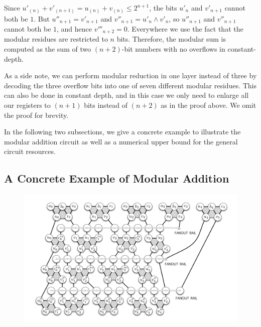 Since $u'_{(n)} + v'_{(n+1)} =
u_{(n)} + v_{(n)} \le 2^{n+1}$, the bits $u'_n$ and $v'_{n+1}$ cannot both be $1$.
But $u''_{n+1} = v'_{n+1}$ and $v''_{n+1} = u'_n\land v'_n$, so $u''_{n+1}$ and
$v''_{n+1}$ cannot both be $1$, and hence $v'''_{n+2} = 0$.
Everywhere
we use the fact that the modular residues are restricted to $n$ bits.
Therefore, the modular sum is computed as the sum of two $(n+2)$-bit numbers
with no overflows in constant-depth.
\square\,

As a side note, we can perform modular reduction in one layer instead of
three by decoding the three overflow bits into one of seven different
modular residues. This can also be done in constant depth, and in this case
we only need to enlarge all our registers to $(n+1)$ bits instead of $(n+2)$
as in the proof above. We omit the proof for brevity.

In the following two subsections, we give a concrete example to illustrate
the modular addition circuit as well as a numerical upper bound for the
general circuit resources.

\subsection{A Concrete Example of Modular Addition}
\label{subsec:concrete}

\begin{center}
\begin{figure}[h!bt]
\centerline{
\includegraphics[width=6.5in]{figures/mod-add-fixed.pdf}
}
\label{fig:csa-add-4}
\end{figure}
\end{center}

